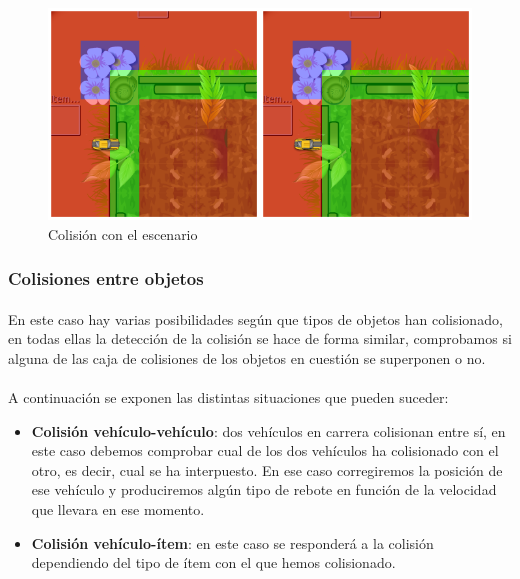 \documentclass[a4paper,11pt]{article} %
\begin{document}
    \begin{figure}[H]
      \label{colision2}
      \begin{center}
        \includegraphics[scale=0.5]{imagenes/colision1-colision2.png}
      \end{center}
      \caption{Colisión con el escenario}
    \end{figure}

\subsubsection{Colisiones entre objetos}

\paragraph{}
En este caso hay varias posibilidades según que tipos de objetos han colisionado, en todas ellas la detección de la colisión
se hace de forma similar, comprobamos si alguna de las caja de colisiones de los objetos en cuestión se superponen o no.

\paragraph{}
A continuación se exponen las distintas situaciones que pueden suceder:

\begin{itemize}
    \item \textbf{Colisión vehículo-vehículo}: dos vehículos en carrera colisionan entre sí, en este caso debemos comprobar 
    cual de los dos vehículos ha colisionado con el otro, es decir, cual se ha interpuesto. En ese caso 
    corregiremos la posición de ese vehículo y produciremos algún tipo de rebote en función de la velocidad que llevara
    en ese momento.
    
    \item \textbf{Colisión vehículo-ítem}: en este caso se responderá a la
    colisión dependiendo del tipo de ítem con el que
    hemos colisionado.
\end{itemize}
\end{document}
